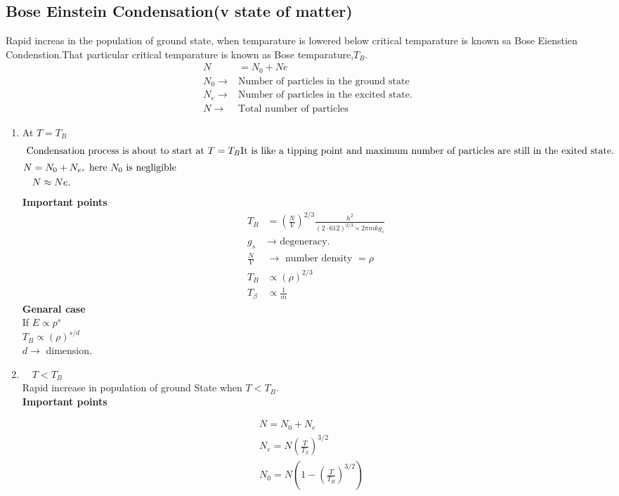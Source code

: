 \subsection{Bose Einstein Condensation(v state of matter)}
Rapid increas in the population of ground state,
when temparature is lowered below critical temparature is known sa Bose Eienstien Condenstion.That particular critical temparature is known as Bose temparature,$T_{B}.$
\begin{align*}
N&=N_{0}+Ne\\
N_{0}\rightarrow &\text{Number of particles in the ground state}\\
N_{e}\rightarrow &\text{Number of particles in the excited state.}\\
N\rightarrow &\text{Total number of particles}
\end{align*}
\begin{enumerate}
	\item At $T=T_{B}$
	\begin{align*}
	\intertext{	Condensation process is about to start at $T=T_{B}$It is like a tipping point and maximum number of particles are still in the exited state.}
	N&=N_{0}+N_{e},\text{ here $N_{0}$ is negligible}\\
	&N \approx N e.
	\end{align*}
	\textbf{Important points}
	\begin{align*}
	T_{B}&=\left(\frac{N}{V}\right)^{2 / 3} \frac{h^{2}}{(2 \cdot 612)^{2 / 3} \times 2 \pi m k g_{s}}\\
	g_{s} &\rightarrow\text{ degeneracy.}\\
	\frac{N}{V} &\rightarrow\text{ number density $=\rho$}\\
	T_{B} &\propto(\rho)^{2 / 3}\\
	T_{\beta} &\propto \frac{1}{m}
	\end{align*}
	\textbf{Genaral case}\\
	If $E \propto p^{s}$ \\$T_{B} \propto(\rho)^{s / d}$\\
	$d \rightarrow$ dimension.
	\item  $\quad T<T_{B}$\\
	Rapid increase in population of ground State when $T<T_{B}$.\\
	\textbf{Important points}\\
\end{enumerate}
\begin{align*}
&N=N_{0}+N_{e} \\
&N_{e}=N\left(\frac{T}{T_{\beta}}\right)^{3 / 2} \\
&N_{0}=N\left(1-\left(\frac{T}{T_{B}}\right)^{3 / 2}\right)
\end{align*}
